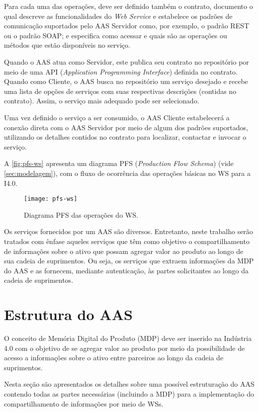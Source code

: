 	Para cada uma das operações, deve ser definido também o contrato, documento o qual descreve as funcionalidades do \textit{Web Service} e estabelece os padrões de comunicação suportados pelo AAS Servidor como, por exemplo, o padrão REST ou o padrão SOAP; e especifica como acessar e quais são as operações ou métodos que estão disponíveis no serviço. 
	
	Quando o AAS atua como Servidor, este publica seu contrato no repositório por meio de uma API (\textit{Application Programming Interface}) definida no contrato. Quando como Cliente, o AAS busca no repositório um serviço desejado e recebe uma lista de opções de serviços com suas respectivas descrições (contidas no contrato). Assim, o serviço mais adequado pode ser selecionado.
	
	Uma vez definido o serviço a ser consumido, o AAS Cliente estabelecerá a conexão direta com o AAS Servidor por meio de algum dos padrões suportados, utilizando os detalhes contidos no contrato para localizar, contactar e invocar o serviço.	
	
	A \autoref{fig:pfs-ws} apresenta um diagrama PFS (\textit{Production Flow Schema}) (vide \autoref{sec:modelagem}), com o fluxo de ocorrência das operações básicas no WS para a I4.0.
	
	\begin{figure}[htb]
		\centering
		\label{fig:pfs-ws}
		\texttt{[image: pfs-ws]}
		\caption{Diagrama PFS das operações do WS.}
	\end{figure}
	
	Os serviços fornecidos por um AAS são diversos. Entretanto, neste trabalho serão tratados com ênfase aqueles serviços que têm como objetivo o compartilhamento de informações sobre o ativo que possam agregar valor ao produto ao longo de sua cadeia de suprimentos. Ou seja, os serviços que extraem informações da MDP do AAS e as fornecem, mediante autenticação, às partes solicitantes ao longo da cadeia de suprimentos.

\section{Estrutura do AAS}

	O conceito de Memória Digital do Produto (MDP) deve ser inserido na Indústria 4.0 com o objetivo de se agregar valor ao produto por meio da possibilidade de acesso a informações sobre o ativo entre parceiros ao longo da cadeia de suprimentos.
	
	Nesta seção são apresentados os detalhes sobre uma possível estruturação do AAS contendo todas as partes necessárias (incluindo a MDP) para a implementação do compartilhamento de informações por meio de WSs.
	
